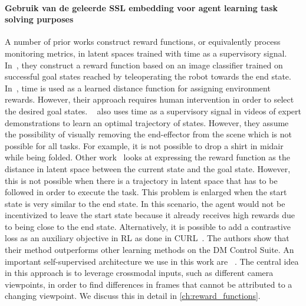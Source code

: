 \documentclass[\home/main.tex]{subfiles}
\begin{document}
\paragraph{Gebruik van de geleerde SSL embedding voor agent learning task solving purposes}
A number of prior works construct reward functions, or equivalently process monitoring metrics, in latent spaces trained with time as a supervisory signal.
In~\cite{Singh2019}, they construct a reward function based on an image classifier trained on successful goal states reached by teleoperating the robot towards the end state. In~\cite{Hartikainen2019}, time is used as a learned distance function for assigning environment rewards. However, their approach requires human intervention in order to select the desired goal states. ~\cite{Nair2018time} also uses time as a supervisory signal in videos of expert demonstrations to learn an optimal trajectory of states. However, they assume the possibility of visually removing the end-effector from the scene which is not possible for all tasks. For example, it is not possible to drop a shirt in midair while being folded. Other work~\cite{Nair2018visual} looks at expressing the reward function as the distance in latent space between the current state and the goal state. However, this is not possible when there is a trajectory in latent space that has to be followed in order to execute the task. This problem is enlarged when the start state is very similar to the end state. In this scenario, the agent would not be incentivized to leave the start state because it already receives high rewards due to being close to the end state. %
Alternatively, it is possible to add a contrastive loss as an auxiliary objective in RL as done in CURL~\cite{Srinivas2020CURL}. The authors show that their method outperforms other learning methods on the DM Control Suite.
An important self-supervised architecture we use in this work are ~\autocite{Sermanet2017TCN}. The central idea in this approach is to leverage crossmodal inputs, such as different camera viewpoints, in order to find differences in frames that cannot be attributed to a changing viewpoint. We discuss this in detail in \cref{ch:reward_functions}.


 
\end{document}
